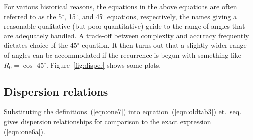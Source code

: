 
\par
For various historical reasons,
the equations in
the above equations
are often referred to as the
5$^\circ$, 15$^\circ$, and 45$^\circ$ equations, respectively, 
the names giving a reasonable qualitative (but poor quantitative) guide to
the range of angles that are adequately handled.
A trade-off between complexity and accuracy frequently dictates choice of
the 45$^\circ$ equation.
It then turns out that a slightly wider range of angles can be
accommodated if the recurrence is begun
with something like  $R_0 = \cos$ 45$^\circ$.
Figure~\ref{fig:disper} shows some plots.
\subsection{Dispersion relations}
\par
Substituting the definitions~(\ref{eqn:one7})
into equation~(\ref{eqn:oldtab3}) et.~seq.
gives dispersion relationships
for comparison to the exact expression (\ref{eqn:one6a}).


